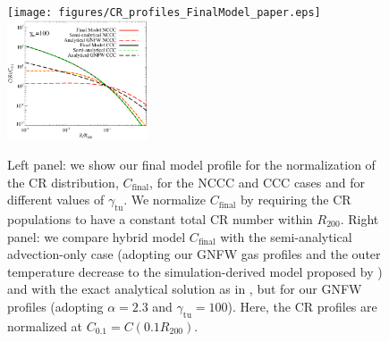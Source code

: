 \documentclass[traditabstract]{aa}
\newcommand{\rmn}{\mathrm}
\begin{document}
\begin{figure}[t]
\centering
\texttt{[image: figures/CR\_profiles\_FinalModel\_paper.eps]}
\includegraphics[width=0.37\textwidth]{figures/CR_profiles_FinalModelvsREX_norm0.1.eps}
\caption{Left panel: we show our final model profile for the normalization of
  the CR distribution, $C_{\rmn{final}}$, for the NCCC and CCC cases and for
  different values of $\gamma_{\rmn{tu}}$. We normalize $C_{\rmn{final}}$ by
  requiring the CR populations to have a constant total CR number within
  $R_{200}$. Right panel: we compare hybrid model $C_{\rmn{final}}$ with the semi-analytical
  advection-only case (adopting our GNFW gas profiles and the outer temperature
  decrease to the simulation-derived model proposed by
  \citep{2010MNRAS.409..449P}) and with the exact analytical solution as in
  \citet{2011A&A...527A..99E}, but for our GNFW profiles (adopting $\alpha=2.3$
  and $\gamma_{\rmn{tu}}=100$). Here, the CR profiles are normalized at
  $C_{0.1}=C(0.1R_{200})$.}
\label{fig:CRFinalModel}
\end{figure}
\end{document}
